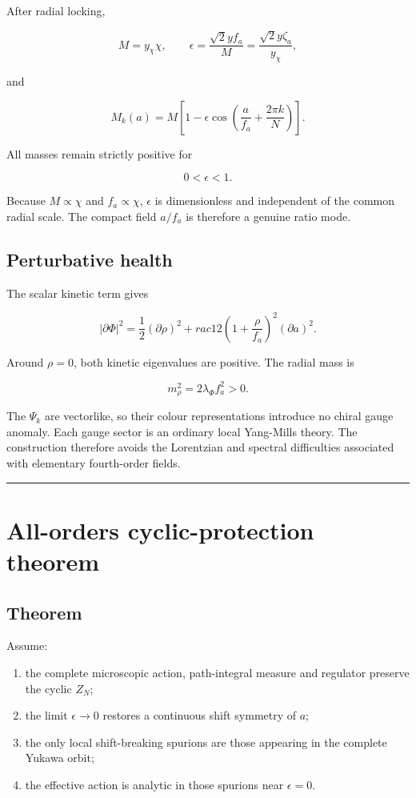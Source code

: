\documentclass[11pt,a4paper]{article}
\providecommand{\tightlist}{\setlength{\itemsep}{0pt}\setlength{\parskip}{0pt}}
\begin{document}
After radial locking,

\[
M=y_\chi\chi,
\qquad
\epsilon=\frac{\sqrt2yf_a}{M}
=\frac{\sqrt2y\zeta_a}{y_\chi},
\]

and

\[
\boxed{
M_k(a)
=M\left[
1-\epsilon\cos\left(\frac a{f_a}+\frac{2\pi k}{N}\right)
\right].
}
\]

All masses remain strictly positive for

\[
0<\epsilon<1.
\]

Because \(M\propto\chi\) and \(f_a\propto\chi\), \(\epsilon\) is
dimensionless and independent of the common radial scale. The compact
field \(a/f_a\) is therefore a genuine ratio mode.

\subsection{Perturbative health}\label{perturbative-health}

The scalar kinetic term gives

\[
|\partial\Phi|^2
=
\frac12(\partial\rho)^2
+
rac12\left(1+\frac\rho{f_a}\right)^2(\partial a)^2.
\]

Around \(\rho=0\), both kinetic eigenvalues are positive. The radial
mass is

\[
m_\rho^2=2\lambda_\Phi f_a^2>0.
\]

The \(\Psi_k\) are vectorlike, so their colour representations introduce
no chiral gauge anomaly. Each gauge sector is an ordinary local
Yang-Mills theory. The construction therefore avoids the Lorentzian and
spectral difficulties associated with elementary fourth-order fields.

\begin{center}\rule{0.5\linewidth}{0.5pt}\end{center}

\section{All-orders cyclic-protection
theorem}\label{all-orders-cyclic-protection-theorem}

\subsection{Theorem}\label{theorem}

Assume:

\begin{enumerate}
\def\labelenumi{\arabic{enumi}.}
\tightlist
\item
  the complete microscopic action, path-integral measure and regulator
  preserve the cyclic \(Z_N\);
\item
  the limit \(\epsilon\to0\) restores a continuous shift symmetry of
  \(a\);
\item
  the only local shift-breaking spurions are those appearing in the
  complete Yukawa orbit;
\item
  the effective action is analytic in those spurions near
  \(\epsilon=0\).
\end{enumerate}
\end{document}
